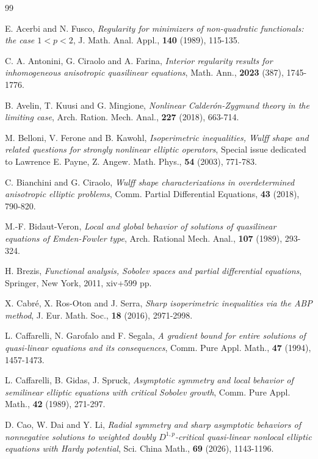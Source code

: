\documentclass[12pt]{amsart}
\theoremstyle{definition}
\theoremstyle{remark}
\theoremstyle{conclusion}
\theoremstyle{conjecture}
\numberwithin{equation}{section}
\begin{document}
\begin{thebibliography}{99}

 E. Acerbi and N. Fusco, {\it Regularity for minimizers of non-quadratic functionals: the case $1<p<2$}, J. Math. Anal. Appl., \textbf{140} (1989), 115-135.

 C. A. Antonini, G. Ciraolo and A. Farina, {\it Interior regularity results for inhomogeneous anisotropic quasilinear equations}, Math. Ann., \textbf{2023} (387), 1745-1776.

 B. Avelin, T. Kuusi and G. Mingione, {\it Nonlinear Calder\'{o}n-Zygmund theory in the limiting case}, Arch. Ration. Mech. Anal., \textbf{227} (2018), 663-714.

 M. Belloni, V. Ferone and B. Kawohl, {\it Isoperimetric inequalities, Wulff shape and related questions for strongly nonlinear elliptic operators}, Special issue dedicated to Lawrence E. Payne, Z. Angew. Math. Phys., \textbf{54} (2003), 771-783.

 C. Bianchini and G. Ciraolo, {\it Wulff shape characterizations in overdetermined anisotropic elliptic problems}, Comm. Partial Differential Equations, \textbf{43} (2018), 790-820.

 M.-F. Bidaut-Veron, {\it Local and global behavior of solutions of quasilinear equations of Emden-Fowler type}, Arch. Rational Mech. Anal., \textbf{107} (1989), 293-324.

 H. Brezis, {\it  Functional analysis, Sobolev spaces and partial differential equations}, Springer, New York, 2011, xiv+599 pp.

 X. Cabr\'{e}, X. Ros-Oton and J. Serra, {\it Sharp isoperimetric inequalities via the ABP method}, J. Eur. Math. Soc., \textbf{18} (2016), 2971-2998.

 L. Caffarelli, N. Garofalo and F. Segala, {\it A gradient bound for entire solutions of quasi-linear equations and its consequences}, Comm. Pure Appl. Math., \textbf{47} (1994), 1457-1473.

 L. Caffarelli, B. Gidas, J. Spruck, {\it Asymptotic symmetry and local behavior of semilinear elliptic equations with critical Sobolev growth}, Comm. Pure Appl. Math., \textbf{42} (1989), 271-297.

 D. Cao, W. Dai and Y. Li, {\it Radial symmetry and sharp asymptotic behaviors of nonnegative solutions to weighted doubly $D^{1,p}$-critical quasi-linear nonlocal elliptic equations with Hardy potential}, Sci. China Math., \textbf{69} (2026), 1143-1196.


\end{thebibliography}
\end{document}
